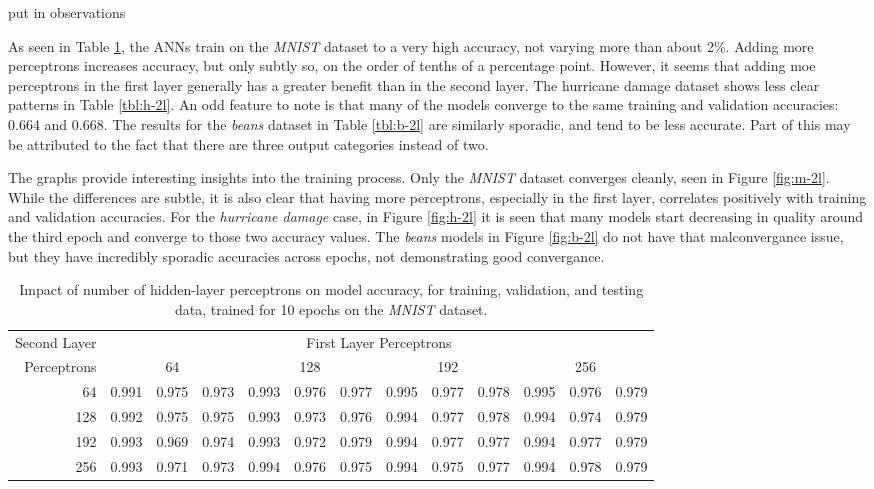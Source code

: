 \documentclass{article}
\begin{document}
put in observations

As seen in Table \ref{tbl:m-2l}, the ANNs train on the \emph{MNIST} dataset to a very high accuracy, not varying more than about 2\%. Adding more perceptrons increases accuracy, but only subtly so, on the order of tenths of a percentage point. However, it seems that adding moe perceptrons in the first layer generally has a greater benefit than in the second layer. The hurricane damage dataset shows less clear patterns in Table \ref{tbl:h-2l}. An odd feature to note is that many of the models converge to the same training and validation accuracies: 0.664 and 0.668. The results for the \emph{beans} dataset in Table \ref{tbl:b-2l} are similarly sporadic, and tend to be less accurate. Part of this may be attributed to the fact that there are three output categories instead of two.

The graphs provide interesting insights into the training process. Only the \emph{MNIST} dataset converges cleanly, seen in Figure \ref{fig:m-2l}. While the differences are subtle, it is also clear that having more perceptrons, especially in the first layer, correlates positively with training and validation accuracies. For the \emph{hurricane damage} case, in Figure \ref{fig:h-2l} it is seen that many models start decreasing in quality around the third epoch and converge to those two accuracy values. The \emph{beans} models in Figure \ref{fig:b-2l} do not have that malconvergance issue, but they have incredibly sporadic accuracies across epochs, not demonstrating good convergance.

\begin{table}[h!]
	\centering
	\caption{Impact of number of hidden-layer perceptrons on model accuracy, for training, validation, and testing data, trained for 10 epochs on the \emph{MNIST} dataset.}
	\label{tbl:m-2l}
	\begin{tabular}{r|ccc|ccc|ccc|ccc}
		Second Layer & \multicolumn{12}{c}{First Layer Perceptrons} \\
		Perceptrons & \multicolumn{3}{c}{64} & \multicolumn{3}{c}{128} & \multicolumn{3}{c}{192} & \multicolumn{3}{c}{256} \\
		\hline
		64 & 0.991 & 0.975 & 0.973 & 0.993 & 0.976 & 0.977 & 0.995 & 0.977 & 0.978 & 0.995 & 0.976 & 0.979 \\
		128 & 0.992 & 0.975 & 0.975 & 0.993 & 0.973 & 0.976 & 0.994 & 0.977 & 0.978 & 0.994 & 0.974 & 0.979 \\
		192 & 0.993 & 0.969 & 0.974 & 0.993 & 0.972 & 0.979 & 0.994 & 0.977 & 0.977 & 0.994 & 0.977 & 0.979 \\
		256 & 0.993 & 0.971 & 0.973 & 0.994 & 0.976 & 0.975 & 0.994 & 0.975 & 0.977 & 0.994 & 0.978 & 0.979
	\end{tabular}
\end{table}
\end{document}
